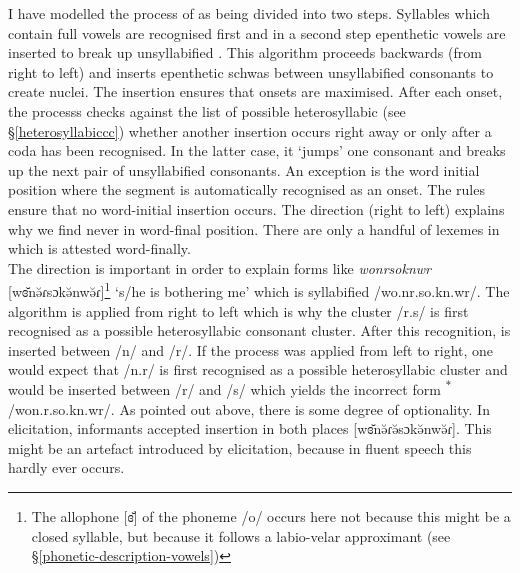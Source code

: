 I have modelled the process of  as being divided into two steps. Syllables which contain full vowels are recognised first and in a second step epenthetic vowels are inserted to break up unsyllabified . This algorithm proceeds backwards (from right to left) and inserts epenthetic schwas between unsyllabified consonants to create  nuclei. The insertion ensures that onsets are maximised. After each onset, the processs checks against the list of possible heterosyllabic  (see \S{}\ref{heterosyllabiccc}) whether another insertion occurs right away or only after a coda has been recognised. In the latter case, it `jumps' one consonant and breaks up the next pair of unsyllabified consonants. An exception is the word initial position where the segment is automatically recognised as an onset. The rules ensure that no word-initial  insertion occurs. The direction (right to left) explains why we find  never in word-final position. There are only a handful of lexemes in which  is attested word-finally.\\

The direction is important in order to explain forms like \emph{wonrsoknwr} [wɞ̆nə̆ɾsɔkə̆nwə̆ɾ]\footnote{The allophone [ɞ̆] of the phoneme /o/ occurs here not because this might be a closed syllable, but because it follows a labio-velar approximant (see \S{}\ref{phonetic-description-vowels})} `s/he is bothering me' which is syllabified /wo.nr.so.kn.wr/. The algorithm is applied from right to left which is why the cluster /r.s/ is first recognised as a possible heterosyllabic consonant cluster. After this recognition,  is inserted between /n/ and /r/. If the process was applied from left to right, one would expect that /n.r/ is first recognised as a possible heterosyllabic cluster and  would be inserted between /r/ and /s/ which yields the incorrect form \textsuperscript{$\ast$}/won.r.so.kn.wr/. As pointed out above, there is some degree of optionality. In elicitation, informants accepted  insertion in both places [wɞ̆nə̆ɾə̆sɔkə̆nwə̆ɾ]. This might be an artefact introduced by elicitation, because in fluent speech this hardly ever occurs.\\

